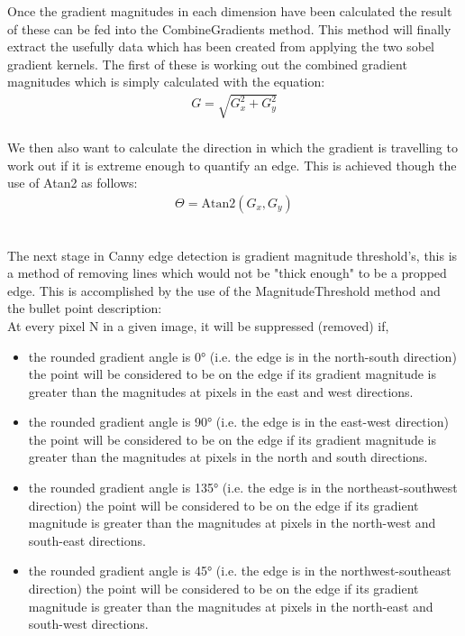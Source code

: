 \begin{FlushLeft}
    \bk

    Once the gradient magnitudes in each dimension have been calculated the result of these can be fed into the CombineGradients method. This method will finally extract the usefully data which has been created from applying the two sobel gradient kernels. The first of these is working out the combined gradient magnitudes which is simply calculated with the equation: \\
    
    \begin{gather*}
        G = \sqrt{G_x^2 + G_y^2}
    \end{gather*} \\
    
    We then also want to calculate the direction in which the gradient is travelling to work out if it is extreme enough to quantify an edge. This is achieved though the use of Atan2 as follows:\\
    
    \begin{gather*}
        \Theta = \text{Atan2}(G_x, G_y)
    \end{gather*} \\ 

    \bk

    The next stage in Canny edge detection is gradient magnitude threshold's, this is a method of removing lines which would not be "thick enough" to be a propped edge. This is accomplished by the use of the MagnitudeThreshold method and the bullet point description: \\ 
    
    At every pixel N in a given image, it will be suppressed (removed) if,
    \begin{itemize}
        \item the rounded gradient angle is 0° (i.e. the edge is in the north-south direction) the point will be considered to be on the edge if its gradient magnitude is greater than the magnitudes at pixels in the east and west directions.
        \item the rounded gradient angle is 90° (i.e. the edge is in the east-west direction) the point will be considered to be on the edge if its gradient magnitude is greater than the magnitudes at pixels in the north and south directions.
        \item the rounded gradient angle is 135° (i.e. the edge is in the northeast-southwest direction) the point will be considered to be on the edge if its gradient magnitude is greater than the magnitudes at pixels in the north-west and south-east directions.
        \item the rounded gradient angle is 45° (i.e. the edge is in the northwest-southeast direction) the point will be considered to be on the edge if its gradient magnitude is greater than the magnitudes at pixels in the north-east and south-west directions.


\end{itemize}
\end{FlushLeft}
